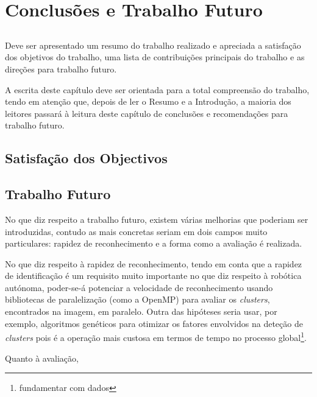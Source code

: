 \chapter{Conclusões e Trabalho Futuro} \label{chap:concl}

\section*{}

Deve ser apresentado um resumo do trabalho realizado e apreciada a
satisfação dos objetivos do trabalho, uma lista de contribuições
principais do trabalho e as direções para trabalho futuro.

A escrita deste capítulo deve ser orientada para a total compreensão
do trabalho, tendo em atenção que, depois de ler o Resumo e a
Introdução, a maioria dos leitores passará à leitura deste capítulo de
conclusões e recomendações para trabalho futuro.

\section{Satisfação dos Objectivos}

 

\section{Trabalho Futuro}

No que diz respeito a trabalho futuro, existem várias melhorias que poderiam ser introduzidas, contudo as mais concretas seriam em dois campos muito particulares: rapidez de reconhecimento e a forma como a avaliação é realizada.

No que diz respeito à rapidez de reconhecimento, tendo em conta que a rapidez de identificação é um requisito muito importante no que diz respeito à robótica autónoma, poder-se-á potenciar a velocidade de reconhecimento usando bibliotecas de paralelização (como a OpenMP) para avaliar os \emph{clusters}, encontrados na imagem, em paralelo. Outra das hipóteses seria usar, por exemplo, algoritmos genéticos para otimizar os fatores envolvidos na deteção de \emph{clusters} pois é a operação mais custosa em termos de tempo no processo global\footnote{fundamentar com dados}.

Quanto à avaliação, 





